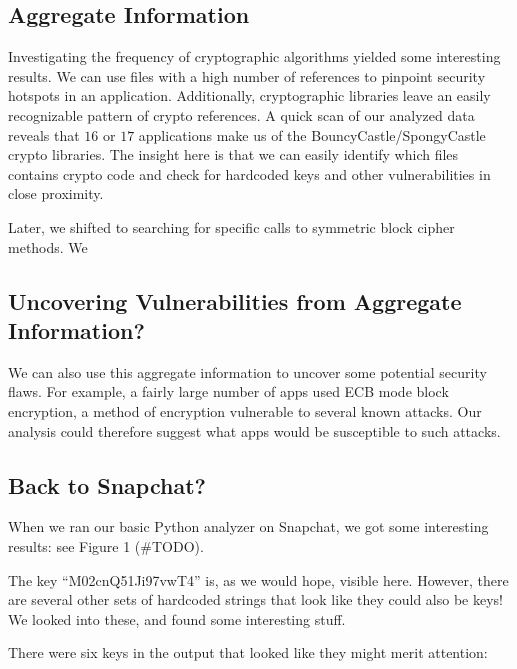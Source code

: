 \documentclass[11pt]{article}
\numberwithin{theorem}{subsection}
\begin{document}
\subsection{Aggregate Information}

  Investigating the frequency of cryptographic algorithms yielded some interesting results. We can use
files with a high number of references to pinpoint security hotspots in an application. Additionally, 
cryptographic libraries leave an easily recognizable pattern of crypto references. A quick scan
of our analyzed data reveals that $16$ or $17$ applications make us of the BouncyCastle/SpongyCastle crypto
libraries. The insight here is that we can easily identify which files contains crypto code and check
for hardcoded keys and other vulnerabilities in close proximity.

  Later, we shifted to searching for specific calls to symmetric block cipher methods. We 
  
\subsection{Uncovering Vulnerabilities from Aggregate Information?}

We can also use this aggregate information to uncover some potential security flaws.  For example, a fairly large number
of apps used ECB mode block encryption, a method of encryption vulnerable to several known attacks.  Our analysis could
therefore suggest what apps would be susceptible to such attacks.

\subsection{Back to Snapchat?}

When we ran our basic Python analyzer on Snapchat, we got some interesting results: see Figure 1 (\#TODO).

The key ``M02cnQ51Ji97vwT4'' is, as we would hope, visible here.  However, there are several other sets of
hardcoded strings that look like they could also be keys!  We looked into these, and found some interesting stuff.

There were six keys in the output that looked like they might merit attention:
\end{document}
